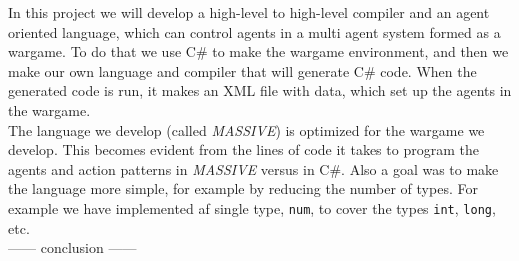 In this project we will develop a high-level to high-level compiler and an agent oriented language, which can control agents in a multi agent system formed as a wargame. To do that we use C\# to make the wargame environment, and then we make our own language and compiler that will generate C\# code. When the generated code is run, it makes an XML file with data, which set up the agents in the wargame.\\ \indent
The language we develop (called \textit{MASSIVE}) is optimized for the wargame we develop. This becomes evident from the lines of code it takes to program the agents and action patterns in \textit{MASSIVE} versus in C\#. Also a goal was to make the language more simple, for example by reducing the number of types. For example we have implemented af single type, \texttt{num}, to cover the types \texttt{int}, \texttt{long}, etc. \\ \indent
------ conclusion ------